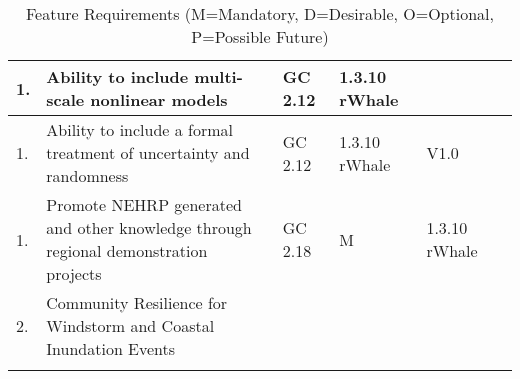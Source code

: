 \begin{longtable}{| p{} | p{} | p{} | p{} | p{} | p{} |}
1.  & Ability to include multi-scale nonlinear models & GC 2.12 & 1.3.10 rWhale & \\ \hline
1. & Ability to include a formal treatment of uncertainty and randomness & GC 2.12 & 1.3.10 rWhale & V1.0 \\ \hline
1. &  Promote NEHRP generated and other knowledge through regional demonstration projects & GC 2.18 & M & 1.3.10 rWhale \\ \hline
2. & Community Resilience for Windstorm and Coastal Inundation Events &  &  &  \\ \hline
\caption{Feature Requirements (M=Mandatory, D=Desirable, O=Optional, P=Possible Future)}             
  \label{tab:featureRequirements}                 
\end{longtable}




